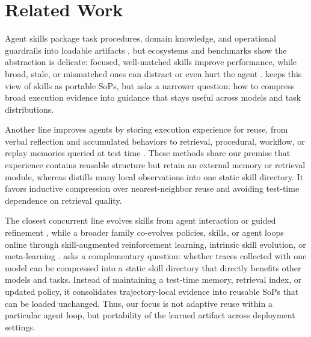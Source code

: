 \section{Related Work}
\label{sec:related}

Agent skills package task procedures, domain knowledge, and operational guardrails into loadable artifacts \citep{anthropic2026skills}, but ecosystems and benchmarks show the abstraction is delicate: focused, well-matched skills improve performance, while broad, stale, or mismatched ones can distract or even hurt the agent \citep{zhou2026comprehensivesurveyagentskills,li2026skillsbenchbenchmarkingagentskills,han2026sweskillsbenchagentskillsactually,li2026singleagentskillsreplacemultiagent,li2026organizingorchestratingbenchmarkingagent,liang2026skillnetcreateevaluateconnect}. \systemname{} keeps this view of skills as portable SoPs, but asks a narrower question: how to compress broad execution evidence into guidance that stays useful across models and task distributions.

Another line improves agents by storing execution experience for reuse, from verbal reflection and accumulated behaviors to retrieval, procedural, workflow, or replay memories queried at test time \citep{shinn2023reflexionlanguageagentsverbal,wang2023voyageropenendedembodiedagent,ouyang2026reasoningbankscalingagentselfevolving,fang2026mempexploringagentprocedural,wang2024agentworkflowmemory,qian2024investigateconsolidateexploitgeneralstrategyintertask,nottingham2024skillsetoptimizationreinforcing,liu2025contextualexperiencereplayselfimprovement}. These methods share our premise that experience contains reusable structure but retain an external memory or retrieval module, whereas \systemname{} distills many local observations into one static skill directory. It favors inductive compression over nearest-neighbor reuse and avoiding test-time dependence on retrieval quality.


The closest concurrent line evolves skills from agent interaction or guided refinement
\citep{zheng2025skillweaverwebagentsselfimprove,yang2026autoskillexperiencedrivenlifelonglearning,jiang2026xskillcontinuallearningexperience,alzubi2026evoskillautomatedskilldiscovery,zhou2026mementoskillsletagentsdesign,ma2026skillgenverifiedinferencetime,anthropic2026skillcreatorconversation},
while a broader family co-evolves policies, skills, or agent loops online through skill-augmented reinforcement learning, intrinsic skill evolution, or meta-learning
\citep{xia2026skillrlevolvingagentsrecursive,li2026ariseagentreasoningintrinsic,xia2026metaclawjusttalk}.
\systemname{} asks a complementary question: whether traces collected with one model can be compressed into a static skill directory that directly benefits other models and tasks. Instead of maintaining a test-time memory, retrieval index, or updated policy, it consolidates trajectory-local evidence into reusable SoPs that can be loaded unchanged. Thus, our focus is not adaptive reuse within a particular agent loop, but portability of the learned artifact across deployment settings.
